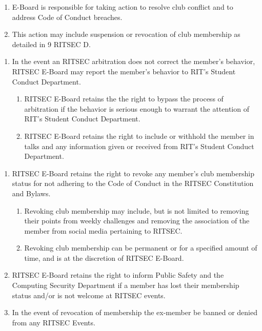 \begin{enumerate}
      \item E-Board is responsible for taking action to resolve club conflict and to
            address Code of Conduct breaches.
      \item This action may include suspension or revocation of club membership as detailed
            in 9 RITSEC D.
\end{enumerate}


\begin{enumerate}
      \item In the event an RITSEC arbitration does not correct the member’s behavior,
            RITSEC E-Board may report the member’s behavior to RIT’s Student Conduct
            Department.
            \begin{enumerate}
                  \item RITSEC E-Board retains the the right to bypass the process of arbitration if
                        the behavior is serious enough to warrant the attention of RIT’s Student
                        Conduct Department.
                  \item RITSEC E-Board retains the right to include or withhold the member in talks and
                        any information given or received from RIT’s Student Conduct Department.
            \end{enumerate}
\end{enumerate}


\begin{enumerate}
      \item RITSEC E-Board retains the right to revoke any member’s club membership status
            for not adhering to the Code of Conduct in the RITSEC Constitution and Bylaws.
            \begin{enumerate}
                  \item Revoking club membership may include, but is not limited to removing their
                        points from weekly challenges and removing the association of the member from
                        social media pertaining to RITSEC.
                  \item Revoking club membership can be permanent or for a specified amount of time,
                        and is at the discretion of RITSEC E-Board.
            \end{enumerate}
      \item RITSEC E-Board retains the right to inform Public Safety and the Computing
            Security Department if a member has lost their membership status and/or is not
            welcome at RITSEC events.
      \item In the event of revocation of membership the ex-member be banned or denied from
            any RITSEC Events.
\end{enumerate}


